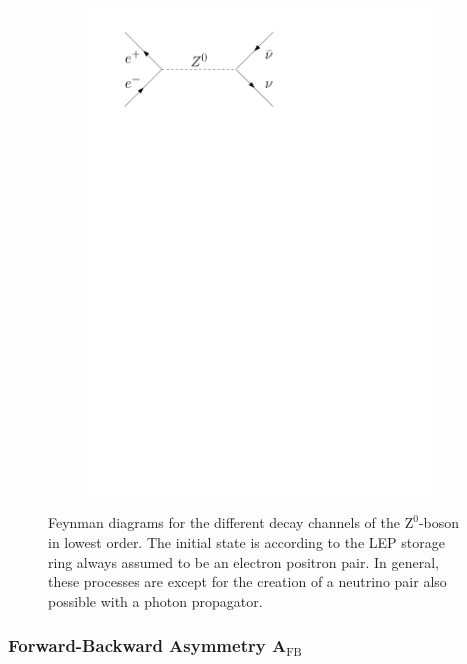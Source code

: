 \documentclass[11pt, a4paper]{article}
\numberwithin{equation}{section}
\begin{document}
\begin{figure}[htb]
\begin{subfigure}{.32\textwidth}
		\includegraphics[width=.9\textwidth]{./figures/theory/feynman/nn}
	\end{subfigure}
	\caption{Feynman diagrams for the different decay channels of the $\mathrm{Z}^0$-boson in lowest order. The initial state is according to the LEP storage ring always assumed to be an electron positron pair. In general, these processes are except for the creation of a neutrino pair also possible with a photon propagator.}
	\label{fig:feynman}
\end{figure}

\subsubsection{Forward-Backward Asymmetry A$_\mathrm{FB}$}
\label{sec:afb}
\end{document}
